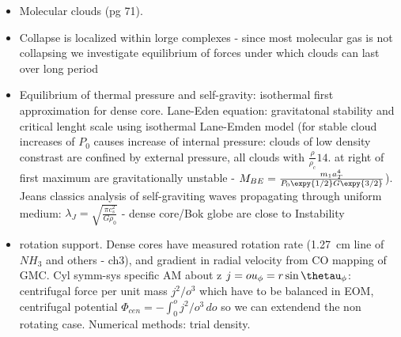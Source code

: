 \begin{itemize}
\item Molecular clouds (pg 71). 
\item Collapse is localized within lorge complexes - since most molecular gas is not collapsing we investigate equilibrium of forces under which clouds can last over long period
\item Equilibrium of thermal pressure and self-gravity: isothermal first approximation for dense core. Lane-Eden equation: gravitatonal stability and critical lenght scale using isothermal Lane-Emden model (for stable cloud increases of $P_0$ causes increase of internal pressure: clouds of low density constrast are confined by external pressure, all clouds with $\frac{\rho}{\rho_c}14.$ at right of first maximum are gravitationally unstable - $M_{BE}=\frac{m_1a_T^4}{P_0\expy{1/2}G\expy{3/2}}$). Jeans classics analysis of self-graviting waves propagating through uniform medium: $\lambda_J=\sqrt{\frac{\pi c_s^2}{G\rho_0}}$ - dense core/Bok globe are close to Instability
\item rotation support. Dense cores have measured rotation rate (\SI{1.27}{\cm} line of $NH_3$ and others - ch3), and gradient in radial velocity from CO mapping of GMC. Cyl symm-sys specific AM about z $j=ou_{\phi}=r\sin\thetau_{\phi}$: centrifugal force per unit mass $j^2/o^3$ which have to be balanced in EOM, centrifugal potential $\Phi_{cen}=-\int_0^oj^2/o^3\,do$ so we can extendend the non rotating case. Numerical methods: trial density. 
\end{itemize}